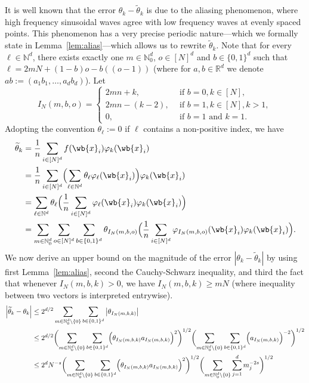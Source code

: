 \documentclass{article}
\newcommand{\Reals}{\mathbb{R}}
\newcommand{\abs}[1]{\left \lvert #1 \right \rvert}
\newcommand{\1}{\mathbf{1}}
\newcommand{\Nbb}{\mathbb{N}}
\newcommand{\wt}[1]{\widetilde{#1}}
\theoremstyle{alden}
\theoremstyle{aldenthm}
\theoremstyle{definition}
\theoremstyle{remark}
\begin{document}
It is well known that the error $\theta_k - \wt{\theta}_k$ is due to the aliasing phenomenon, where high frequency sinusoidal waves agree with low frequency waves at evenly spaced points. This phenomenon has a very precise periodic nature---which we formally state in Lemma~\ref{lem:alias}---which allows us to rewrite $\wt{\theta}_k$. Note that for every $\ell \in \mathbb{N}^d$, there exists exactly one $m \in \mathbb{N}_0^d$, $o \in [N]^d$ and $b \in \{0,1\}^d$ such that $\ell = 2mN + (1 - b)o - b((o - 1))$ (where for $a,b \in \Reals^d$ we denote $ab := (a_1b_1,\ldots,a_db_d)$). Let
\begin{equation*}
I_N(m,b,o) = 
\begin{cases*}
2mn + k,& ~~\textrm{if $b = 0, k \in [N]$,} \\
2mn - (k - 2),& ~~\textrm{if $b = 1, k \in [N], k > 1$}, \\
0,& ~~\textrm{if $b = 1$ and $k = 1$.}
\end{cases*}
\end{equation*}
Adopting the convention $\theta_{\ell} := 0$ if $\ell$ contains a non-positive index, we have
\begin{align*}
\wt{\theta}_k & = \frac{1}{n} \sum_{i \in [N]^d} f(\wb{x}_i) \varphi_k(\wb{x}_i) \\
& = \frac{1}{n} \sum_{i \in [N]^d} \Bigl(\sum_{\ell \in \Nbb^d} \theta_{\ell} \varphi_{\ell}(\wb{x}_i) \Bigr) \varphi_k(\wb{x}_i) \\
& = \sum_{\ell \in \mathbb{N}^d} \theta_{\ell} \Bigl(\frac{1}{n} \sum_{i \in [N]^d} \varphi_{\ell}(\wb{x}_i) \varphi_{k}(\wb{x}_i)\Bigr) \\
& = \sum_{m \in \mathbb{N}_0^d} \sum_{o \in [N]^d}\sum_{b \in \{0,1\}^d} \theta_{I_N(m,b,o)}  \Bigl(\frac{1}{n} \sum_{i \in [N]^d} \varphi_{I_N(m,b,o)}(\wb{x}_i) \varphi_{k}(\wb{x}_i)\Bigr).
\end{align*}
We now derive an upper bound on the magnitude of the error $|\theta_k - \wt{\theta}_k|$ by using first Lemma~\ref{lem:alias}, second the Cauchy-Schwarz inequality, and third the fact that whenever $I_N(m,b,k) > 0$, we have $I_N(m,b,k) \geq mN$ (where inequality between two vectors is interpreted entrywise).
\begin{align*}
\abs{\wt{\theta}_k - \theta_k} & \leq 2^{d/2} \sum_{m \in \Nbb_0^d \setminus \{0\}} \sum_{b \in \{0,1\}^d} \abs{\theta_{I_N(m,b,k)}} \\
& \leq 2^{d/2} \biggl(\sum_{m \in \Nbb_0^d \setminus \{0\}} \sum_{b \in \{0,1\}^d} \Bigl(\theta_{I_N(m,b,k)}a_{I_N(m,b,k)}\Bigr)^2 \biggr)^{1/2} \biggl(\sum_{m \in \Nbb_0^d \setminus \{0\}} \sum_{b \in \{0,1\}^d} \Bigl(a_{I_N(m,b,k)}\Bigr)^{-2} \biggr)^{1/2} \\
& \leq 2^{d}N^{-s } \biggl(\sum_{m \in \Nbb_0^d \setminus \{0\}} \sum_{b \in \{0,1\}^d} \Bigl(\theta_{I_N(m,b,k)}a_{I_N(m,b,k)}\Bigr)^2 \biggr)^{1/2} \biggl(\sum_{m \in \Nbb_0^d \setminus \{0\}}\sum_{j = 1}^{d} m_j^{-2s} \biggr)^{1/2} 
\end{align*}
\end{document}
